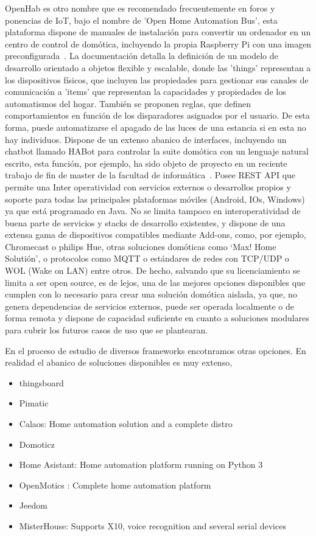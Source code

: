 OpenHab es otro nombre que es recomendado frecuentemente en foros y ponencias de IoT, bajo el nombre de 'Open Home Automation Bus', esta plataforma dispone de manuales de instalación para convertir un ordenador en un centro de control de domótica, incluyendo la propia Raspberry Pi con una imagen preconfigurada~\cite{openHabRaspberryPi}. La documentación detalla la definición de un modelo de desarrollo orientado a objetos flexible y escalable, donde las 'things' representan a los dispositivos físicos, que incluyen las propiedades para gestionar sus canales de comunicación a 'items' que representan la capacidades y propiedades de los automatismos del hogar. También se proponen reglas, que definen comportamientos en función de los disparadores asignados por el usuario. De esta forma, puede automatizarse el apagado de las luces de una estancia si en esta no hay individuos. Dispone de un extenso abanico de interfaces, incluyendo un chatbot llamado HABot para controlar la suite domótica con un lenguaje natural escrito, esta función, por ejemplo, ha sido objeto de proyecto en un reciente trabajo de fin de master de la facultad de informática~\cite{eprint49443}. Posee REST API que permite una Inter operatividad con servicios externos o desarrollos propios y soporte para todas las principales plataformas móviles (Android, IOs, Windows) ya que está programado en Java. No se limita tampoco en interoperatividad de buena parte de servicios y stacks de desarrollo existentes, y dispone de una extensa gama de dispositivos compatibles mediante Add-ons, como, por ejemplo, Chromecast o philips Hue, otras soluciones domóticas como ‘Max! Home Solutión’, o protocolos como MQTT o estándares de redes con TCP/UDP o WOL (Wake on LAN) entre otros. De hecho, salvando que su licenciamiento se limita a ser open source, es de lejos, una de las mejores opciones disponibles que cumplen con lo necesario para crear una solución domótica aislada, ya que, no genera dependencias de servicios externos, puede ser operada localmente o de forma remota y dispone de capacidad suficiente en cuanto a soluciones modulares para cubrir los futuros casos de uso que se plantearan.

En el proceso de estudio de diversos frameworks encotnramos otras opciones. En realidad el abanico de soluciones disponibles es muy extenso,

\begin{itemize}
\item thingsboard
\item Pimatic
\item Calaos: Home automation solution and a complete distro
\item Domoticz
\item Home Asistant: Home automation platform running on Python 3
\item OpenMotics : Complete home automation platform
\item Jeedom
\item MisterHouse: Supports X10, voice recognition and several serial devices
\end{itemize}

